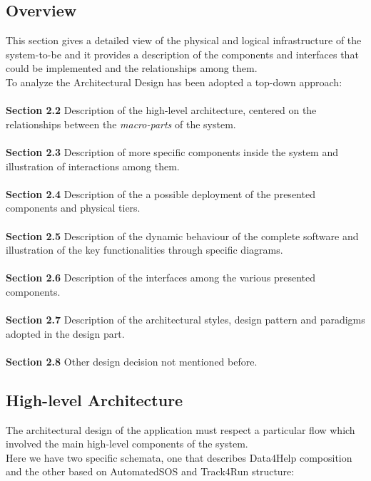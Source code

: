 \documentclass[a4paper]{article}
\begin{document}
\subsection{Overview}
This section gives a detailed view of the physical and logical infrastructure of the system-to-be and it provides a description of the components and interfaces that could be implemented and the relationships among them.\\
To analyze the Architectural Design has been adopted a top-down approach:\\ \\
\textbf{Section 2.2} Description of the high-level architecture, centered on the relationships between the \textit{macro-parts} of the system.\\ \\
\textbf{Section 2.3} Description of more specific components inside the system and illustration of interactions among them.\\ \\
\textbf{Section 2.4} Description of the a possible deployment of the presented components and physical tiers.\\ \\
\textbf{Section 2.5} Description of the dynamic behaviour of the complete software and illustration of the key functionalities through specific diagrams.\\ \\
\textbf{Section 2.6} Description of the interfaces among the various presented components.\\ \\
\textbf{Section 2.7} Description of the architectural styles, design pattern and paradigms adopted in the design part.\\ \\
\textbf{Section 2.8} Other design decision not mentioned before.
\clearpage


\subsection{High-level Architecture}
The architectural design of the application must respect a particular flow which involved the main high-level components of the system.\\
Here we have two specific schemata, one that describes Data4Help composition and the other based on AutomatedSOS and Track4Run structure:
\end{document}
